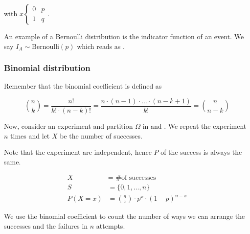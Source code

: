 \documentclass[10pt]{extarticle}
\begin{document}
with $x \begin{cases}
        0 & p \\
        1 & q
    \end{cases}$.

An example of a Bernoulli distribution is the indicator function of an event.
We say $I_A \sim \text{Bernoulli}(p)$ which reads as .

\subsubsection{Binomial distribution}

Remember that the binomial coefficient is defined as

$$
    \binom{n}{k} = \frac{n!}{k! \cdot (n - k)!} = \frac{n \cdot (n - 1) \cdot \ldots \cdot (n - k + 1)}{k!} = \binom{n}{n - k}
$$

Now, consider an experiment and partition $\Omega$ in  and .
We repeat the experiment $n$ times and let $X$ be the number of successes.

Note that the experiment are independent, hence $P$ of the success is always the same.

\begin{align*}
    X        & = \text{ \# of successes}                      \\
    S        & = \{0, 1, \ldots, n\}                          \\
    P(X = x) & = \binom{n}{x} \cdot p^x \cdot (1 - p)^{n - x}
\end{align*}

We use the binomial coefficient to count the number of ways we can arrange the successes and the failures in $n$ attempts.
\end{document}
